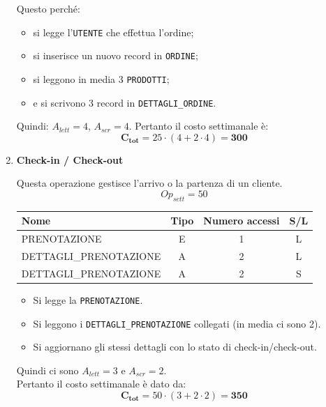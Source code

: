 \documentclass[a4paper,12pt]{report}
\begin{document}
\begin{enumerate}
	      Questo perché:
	      \begin{itemize}
		      \item si legge l'\texttt{UTENTE} che effettua l'ordine;
		      \item si inserisce un nuovo record in \texttt{ORDINE};
		      \item si leggono in media 3 \texttt{PRODOTTI};
		      \item e si scrivono 3 record in \texttt{DETTAGLI\_ORDINE}.
	      \end{itemize}

	      Quindi: $A_{lett}=4$, $A_{scr}=4$.
	      Pertanto il costo settimanale è:
	      $$\mathbf{C_{tot}} = 25 \cdot (4 + 2 \cdot 4) = \mathbf{300}$$

	\item {\large \textbf{Check-in / Check-out}} \label{op5}

	      Questa operazione gestisce l'arrivo o la partenza di un cliente.
	      $$
		      Op_{sett} = 50
	      $$


	      \begin{table}[H]
		      \centering
		      \small
		      \renewcommand{\arraystretch}{1.15}
		      \begin{tabularx}{0.8\textwidth}{|X|c|c|c|}
			      \hline
			      \rowcolor{gray!20}
			      \textbf{Nome}          & \textbf{Tipo} & \textbf{Numero accessi} & \textbf{S/L} \\
			      \hline
			      PRENOTAZIONE           & E             & 1                       & L            \\
			      DETTAGLI\_PRENOTAZIONE & A             & 2                       & L            \\
			      DETTAGLI\_PRENOTAZIONE & A             & 2                       & S            \\
			      \hline
		      \end{tabularx}
	      \end{table}

	      \begin{itemize}
		      \item Si legge la \texttt{PRENOTAZIONE}.
		      \item Si leggono i \texttt{DETTAGLI\_PRENOTAZIONE} collegati (in media ci sono 2).
		      \item Si aggiornano gli stessi dettagli con lo stato di check-in/check-out.
	      \end{itemize}

	      Quindi ci sono $A_{lett}=3$ e $A_{scr}=2$. \\
	      Pertanto il costo settimanale è dato da:
	      $$
		      \mathbf{C_{tot}} = 50 \cdot (3 + 2 \cdot 2) = \mathbf{350}
	      $$


\end{enumerate}
\end{document}
